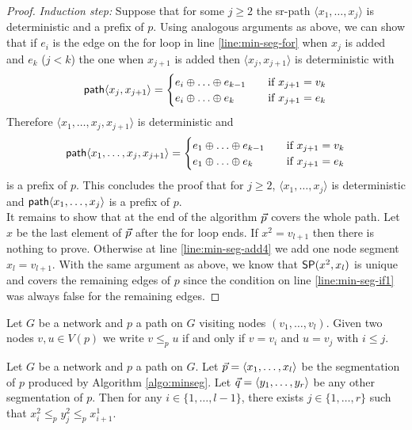 \begin{proof}
\emph{Induction step:} Suppose that for some $j \geq 2$ the sr-path $\langle x_1, \ldots, x_j \rangle$ is deterministic and
a prefix of $p$. Using analogous arguments as above, we can show that if $e_i$ is the edge on the for loop in line \ref{line:min-seg-for} when
$x_j$ is added and $e_k$ ($j < k$) the one when $x_{j + 1}$ is added then $\langle x_j, x_{j + 1} \rangle$ is deterministic with
\[ \seq \langle x_j, x_{j + 1} \rangle                                   =
  \begin{cases}
    e_i \oplus \ldots \oplus e_{k - 1}     & \quad \text{if } x_{j + 1} = v_k \\
    e_i \oplus \ldots \oplus e_{k}  & \quad \text{if } x_{j + 1} = e_k
  \end{cases}
\]
Therefore $\langle x_1, \ldots, x_j, x_{j + 1} \rangle$ is deterministic and 
\[ \seq \langle x_1, \ldots, x_j, x_{j + 1} \rangle  =
  \begin{cases}
    e_1 \oplus \ldots \oplus e_{k - 1} & \quad \text{if } x_{j + 1} = v_k \\
    e_1 \oplus \ldots \oplus e_{k}  & \quad \text{if } x_{j + 1} = e_k
  \end{cases}
\]
is a prefix of $p$. This concludes the proof that for $j \geq 2$, $\langle x_1, \ldots, x_j \rangle$ is deterministic and $\seq \langle x_1, \ldots, x_j \rangle$ is a prefix of $p$. \\

It remains to show that at the end of the algorithm $\sr{p}$ covers the whole path. Let $x$ be the last element of $\sr{p}$
after the for loop ends. If $x^2 = v_{l + 1}$ then there is 
nothing to prove. Otherwise at line \ref{line:min-seg-add4} we add one node segment $x_l = v_{l + 1}$. With the same argument as above,
we know that $\sp(x^2, x_l)$ is unique and covers the remaining edges of $p$ since the condition on line \ref{line:min-seg-if1} was always false for the remaining edges.
\end{proof}

\begin{definition}
Let $G$ be a network and $p$ a path on $G$ visiting nodes $(v_1, \ldots, v_l)$. Given two nodes $v, u \in V(p)$ we write
$v \leq_p u$ if and only if $v = v_i$ and $u = v_j$ with $i \leq j$.
\end{definition}

\begin{lemma}
\label{lemma:min-seg-middle}
Let $G$ be a network and $p$ a path on $G$. Let $\sr{p} = \langle x_1, \ldots, x_l \rangle$ be the segmentation of $p$ produced by Algorithm \ref{algo:minseg}.
Let $\sr{q} = \langle y_1, \ldots, y_r \rangle$ be any other segmentation of $p$. Then for any $i \in \{ 1, \ldots, l - 1 \}$,
there exists $j \in \{ 1, \ldots, r \}$ such that $x^2_i \leq_p y^2_j \leq_p x^1_{i + 1}$.
\end{lemma}

